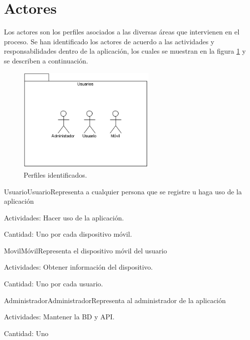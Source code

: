 \newpage
\section{Actores}

Los actores son los perfiles asociados a las diversas áreas que intervienen en el proceso. Se han identificado los actores de acuerdo a las actividades y responsabilidades dentro de la aplicación, los cuales se muestran en la figura \ref{fig:perfiles} y se describen a continuación.


    \begin{figure}[htbp!]
      \begin{center}
      \includegraphics[width=0.6\textwidth]{ModeloComportamiento/imagenes/Actores.png}
      \caption{Perfiles identificados.}
      \label{fig:perfiles}
      \end{center}
    \end{figure}

\begin{actor}{Usuario}{Usuario}{Representa a cualquier persona que se registre u haga uso de la aplicación}
	\item[Actividades:] Hacer uso de la aplicación.
	\item[Cantidad:] Uno por cada dispositivo móvil.
	
\end{actor}


\begin{actor}{Movil}{Móvil}{Representa el dispositivo móvil del usuario}
	\item[Actividades:] Obtener información del dispositivo.
	\item[Cantidad:] Uno por cada usuario.
	
\end{actor}

\begin{actor}{Administrador}{Administrador}{Representa al administrador de la aplicación}
	\item[Actividades:] Mantener la BD y API.
	\item[Cantidad:] Uno
	
\end{actor}